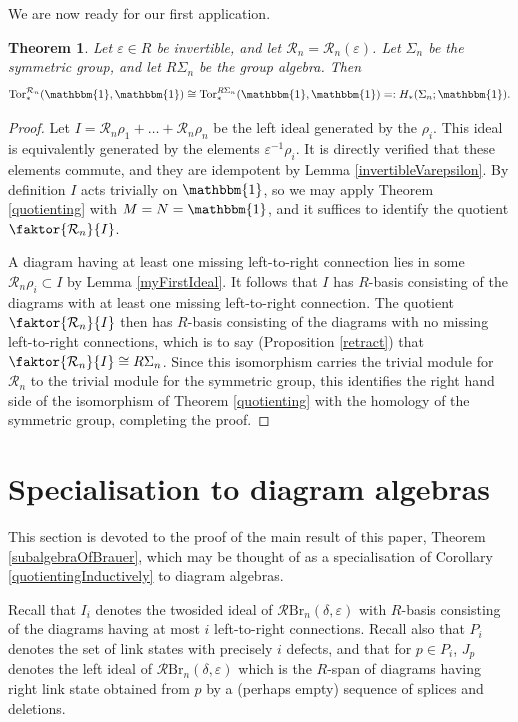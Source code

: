 \documentclass[12pt]{amsart}
\theoremstyle{plain}
\newtheorem{theorem}{Theorem}[section]
\theoremstyle{definition} \newtheorem{definition}[theorem]{Definition}
\theoremstyle{plain}
\theoremstyle{plain} \newtheorem{proposition}[theorem]{Proposition}
\theoremstyle{plain} \newtheorem{conjecture}[theorem]{Conjecture}
\theoremstyle{plain} \newtheorem{corollary}[theorem]{Corollary}
\theoremstyle{remark} \newtheorem{claim}[theorem]{Claim}
\theoremstyle{remark} \newtheorem{remark}[theorem]{Remark}
\theoremstyle{remark} \newtheorem{example}[theorem]{Example}
\theoremstyle{remark} \newtheorem{comment}[theorem]{Comment}
\theoremstyle{definition} \newtheorem{question}[theorem]{Question}
\renewcommand{\t}{\mathbbm{1}}
\newcommand{\rook}{\mathcal{R}}
\newcommand{\Tor}{\mathrm{Tor}}
\newcommand{\Brauer}{\mathrm{Br}}
\newcommand{\mOne}{splice}
\newcommand{\mTwo}{deletion}
\begin{document}
We are now ready for our first application.

\begin{theorem} \label{rookInvertible} Let $\varepsilon \in R$ be invertible, and let $\rook_n = \rook_n(\varepsilon)$. Let $\Sigma_n$ be the symmetric group, and let $R \Sigma_n$ be the group algebra. Then $$\Tor_*^{\rook_n}(\t,\t) \cong \Tor_*^{R \Sigma_n}(\t,\t) =: H_*(\Sigma_n;\t).$$ \end{theorem}

\begin{proof} Let $I= \rook_n \rho_1 + \dots + \rook_n \rho_n$ be the left ideal generated by the $\rho_i$. This ideal is equivalently generated by the elements $\varepsilon^{-1} \rho_i$. It is directly verified that these elements commute, and they are idempotent by Lemma \ref{invertibleVarepsilon}. By definition $I$ acts trivially on $\t$, so we may apply Theorem \ref{quotienting} with $M=N=\t$, and it suffices to identify the quotient $\faktor{\rook_n}{I}$.

A diagram having at least one missing left-to-right connection lies in some $\rook_n \rho_i \subset I$ by Lemma \ref{myFirstIdeal}. It follows that $I$ has $R$-basis consisting of the diagrams with at least one missing left-to-right connection. The quotient $\faktor{\rook_n}{I}$ then has $R$-basis consisting of the diagrams with no missing left-to-right connections, which is to say (Proposition \ref{retract}) that $\faktor{\rook_n}{I} \cong R \Sigma_n$. Since this isomorphism carries the trivial module for $\rook_n$ to the trivial module for the symmetric group, this identifies the right hand side of the isomorphism of Theorem \ref{quotienting} with the homology of the symmetric group, completing the proof. \end{proof}

\section{Specialisation to diagram algebras} \label{SectionDiagram}

This section is devoted to the proof of the main result of this paper, Theorem \ref{subalgebraOfBrauer}, which may be thought of as a specialisation of Corollary \ref{quotientingInductively} to diagram algebras.

Recall that $I_i$ denotes the twosided ideal of $\rook \Brauer_n(\delta, \varepsilon)$ with $R$-basis consisting of the diagrams having at most $i$ left-to-right connections. Recall also that $P_i$ denotes the set of link states with precisely $i$ defects, and that for $p \in P_i$, $J_p$ denotes the left ideal of $\rook \Brauer_n(\delta, \varepsilon)$ which is the $R$-span of diagrams having right link state obtained from $p$ by a (perhaps empty) sequence of {\mOne}s and {\mTwo}s.
\end{document}
